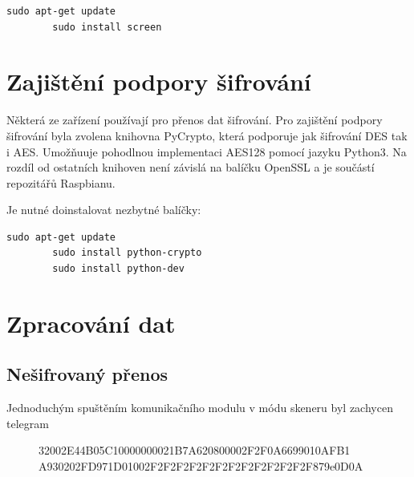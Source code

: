 \begin{lstlisting}[style=MyCodeBash]
		sudo apt-get update
		sudo install screen		
	\end{lstlisting}



\section{Zajištění podpory šifrování}
Některá ze zařízení používají pro přenos dat šifrování. Pro zajištění podpory šifrování byla zvolena knihovna PyCrypto, která podporuje jak šifrování DES tak i AES. 
Umožňuuje pohodlnou implementaci AES128 pomocí jazyku Python3. Na rozdíl od ostatních knihoven není závislá na balíčku OpenSSL a je součástí repozitářů Raspbianu. 

Je nutné doinstalovat nezbytné balíčky:	
 
\begin{lstlisting}[style=MyCodeBash]
		sudo apt-get update
		sudo install python-crypto
		sudo install python-dev
	\end{lstlisting}
	\vspace{-20pt}


\section{Zpracování dat}

\subsection{Nešifrovaný přenos}

Jednoduchým spuštěním komunikačního modulu v módu skeneru byl zachycen telegram

\vspace{-10pt}
\begin{figure}[!ht]
\begin{centerverbatim}
	32002E44B05C10000000021B7A620800002F2F0A6699010AFB1
	A930202FD971D01002F2F2F2F2F2F2F2F2F2F2F2F2F879e0D0A
\end{centerverbatim}
\end{figure}

